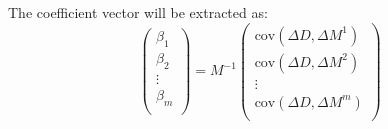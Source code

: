 The coefficient vector will be extracted as:
\begin{equation}
    \begin{pmatrix}
	\beta_1 \\
	\beta_2 \\
	\vdots	\\
	\beta_m \\ 
    \end{pmatrix}
    =
    M^{-1}
    \begin{pmatrix}
	\text{cov}(\Delta D, \Delta M^1)   \\
	\text{cov}(\Delta D, \Delta M^2)   \\
	\vdots	\\
	\text{cov}(\Delta D, \Delta M^m)   \\
    \end{pmatrix}
    \label{eq:slope}
\end{equation}

\begin{comment}
For multiple detectors, it is easy to get:
\begin{equation}
    \small
    \begin{aligned}
	\begin{pmatrix}
	    \beta_{11}	& \beta_{21}    & \cdots & \beta_{m1}	\\
	    \beta_{12}	& \beta_{22}    & \cdots & \beta_{m2}	\\
	    \vdots	& \vdots    & \ddots	& \vdots\\
	    \beta_{1n}	& \beta_{2n}    & \cdots & \beta_{mn}	\\
	\end{pmatrix}
	&= A^{-1}
	&\times
	\begin{pmatrix}
	    \text{cov}(\Delta D^1, \Delta M^1) & \text{cov}(\Delta D^2, \Delta M^1)   & \cdots	& \text{cov}(\Delta D^m, \Delta M^1)	\\
	    \text{cov}(\Delta D^1, \Delta M^2) & \text{cov}(\Delta D^2, \Delta M^2)   & \cdots	& \text{cov}(\Delta D^m, \Delta M^2)	\\
	    \vdots	& \vdots    & \ddots	& \vdots    \\
	    \text{cov}(\Delta D^1, \Delta M^n) & \text{cov}(\Delta D^2, \Delta M^n)   & \cdots	& \text{cov}(\Delta D^m, \Delta M^n)	\\
	\end{pmatrix}
    \end{aligned}
    \label{eq:slope}
\end{equation}
where $\beta_{ij}$ refers to detector i's response to change in monitor j.
\end{comment}

